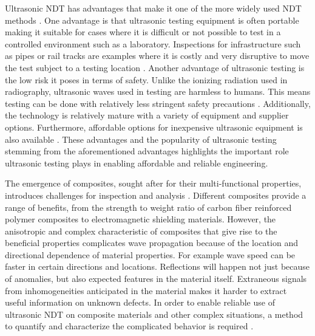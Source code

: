 Ultrasonic NDT has advantages that make it one of the more widely used NDT methods \autocite{howell2020nondestructive, nivenFullWaveformInversion2020, feliceSizingFlawsUsing2018}. One advantage is that ultrasonic testing equipment is often portable making it suitable for cases where it is difficult or not possible to test in a controlled environment such as a laboratory. Inspections for infrastructure such as pipes or rail tracks are examples where it is costly and very disruptive to move the test subject to a testing location \autocite{}. Another advantage of ultrasonic testing is the low risk it poses in terms of safety. Unlike the ionizing radiation used in radiography, ultrasonic waves used in testing are harmless to humans. This means testing can be done with relatively less stringent safety precautions \autocite{}. Additionally, the technology is relatively mature with a variety of equipment and supplier options. Furthermore, affordable options for inexpensive ultrasonic equipment is also available \autocite{}. These advantages and the popularity of ultrasonic testing stemming from the aforementioned advantages highlights the important role ultrasonic testing plays in enabling affordable and reliable engineering.


The emergence of composites, sought after for their multi-functional properties, introduces challenges for inspection and analysis \autocites{inceOverviewEmergingHybrid2023, yangUltrasonicDetectionMethods2023, dwivediAdvancesResearchesNon2018, nivenFullWaveformInversion2020}. Different composites provide a range of benefits, from the strength to weight ratio of carbon fiber reinforced polymer composites to electromagnetic shielding materials. However, the anisotropic and complex characteristic of composites that give rise to the beneficial properties complicates wave propagation because of the location and directional dependence of material properties. For example wave speed can be faster in certain directions and locations. Reflections will happen not just because of anomalies, but also expected features in the material itself. Extraneous signals from inhomogeneities anticipated in the material makes it harder to extract useful information on unknown defects. In order to enable reliable use of ultrasonic NDT on composite materials and other complex situations, a method to quantify and characterize the complicated behavior is required \autocite{maioUltrasoundPropagationComposite2022}.

